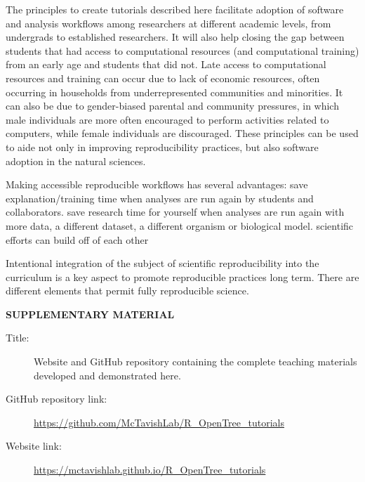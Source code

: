 \documentclass[12pt]{article}
\begin{document}
The principles to create tutorials described here facilitate adoption of software
 and analysis workflows among researchers at different academic levels, from undergrads
  to established researchers.
It will also help closing the gap between students that had access to computational
 resources (and computational training) from an early age and students that did not.
  Late access to computational resources and training can occur due to lack of
   economic resources, often occurring in households from underrepresented communities
    and minorities.
It can also be due to gender-biased parental and community pressures,
 in which male individuals are more often encouraged to perform activities related to computers,
  while female individuals are discouraged.
These principles can be used to aide not only in improving reproducibility practices,
 but also software adoption in the natural sciences.


Making accessible reproducible workflows has several advantages:
save explanation/training time when analyses are run again by students and collaborators.
save research time for yourself when analyses are run again with more data, a different dataset, a different organism or biological model.
scientific efforts can build off of each other

Intentional integration of the subject of scientific reproducibility into
 the curriculum is a key aspect to promote reproducible practices long term.
There are different elements that permit fully reproducible science.

\bigskip
\begin{center}
{\large\bf SUPPLEMENTARY MATERIAL}
\end{center}

\begin{description}

\item[Title:] Website and GitHub repository containing the complete teaching materials developed and demonstrated here.

\item[GitHub repository link:] \url{https://github.com/McTavishLab/R_OpenTree_tutorials}

\item[Website link:] \url{https://mctavishlab.github.io/R_OpenTree_tutorials}

\end{description}




\end{document}
